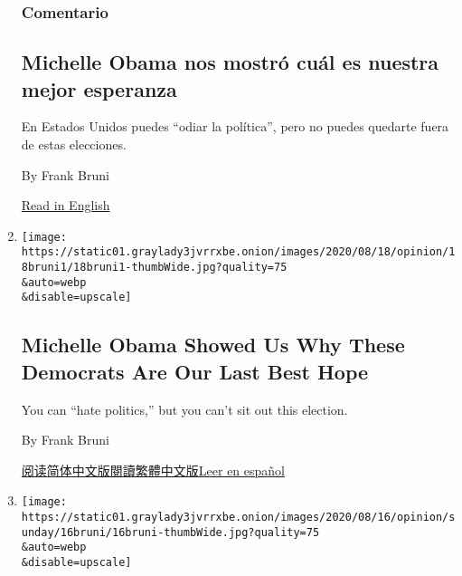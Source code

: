 \begin{enumerate}
{  \subsubsection{Comentario}\label{comentario}}

  \hypertarget{michelle-obama-nos-mostruxf3-cuuxe1l-es-nuestra-mejor-esperanza}{%
  \subsection{Michelle Obama nos mostró cuál es nuestra mejor
  esperanza}\label{michelle-obama-nos-mostruxf3-cuuxe1l-es-nuestra-mejor-esperanza}}

  En Estados Unidos puedes ``odiar la política'', pero no puedes
  quedarte fuera de estas elecciones.

  By Frank Bruni

  \href{https://www.nytimes3xbfgragh.onion/2020/08/18/opinion/michelle-obama-dnc-election-2020.html}{Read
  in English}
\item
  \href{/2020/08/18/opinion/michelle-obama-dnc-election-2020.html}{}

  \texttt{[image: https://static01.graylady3jvrrxbe.onion/images/2020/08/18/opinion/18bruni1/18bruni1-thumbWide.jpg?quality=75\\\&auto=webp\\\&disable=upscale]}

  \hypertarget{michelle-obama-showed-us-why-these-democrats-are-our-last-best-hope}{%
  \subsection{Michelle Obama Showed Us Why These Democrats Are Our Last
  Best
  Hope}\label{michelle-obama-showed-us-why-these-democrats-are-our-last-best-hope}}

  You can ``hate politics,'' but you can't sit out this election.

  By Frank Bruni

  \href{https://cn.nytimes3xbfgragh.onion/opinion/20200819/michelle-obama-dnc-election-2020/}{阅读简体中文版}\href{https://cn.nytimes3xbfgragh.onion/opinion/20200819/michelle-obama-dnc-election-2020/zh-hant}{閱讀繁體中文版}\href{https://www.nytimes3xbfgragh.onion/es/2020/08/19/espanol/opinion/michelle-obama-discurso.html}{Leer
  en español}
\item
  \href{/2020/08/14/opinion/kamala-harris-biden-2020.html}{}

  \texttt{[image: https://static01.graylady3jvrrxbe.onion/images/2020/08/16/opinion/sunday/16bruni/16bruni-thumbWide.jpg?quality=75\\\&auto=webp\\\&disable=upscale]}


\end{enumerate}
